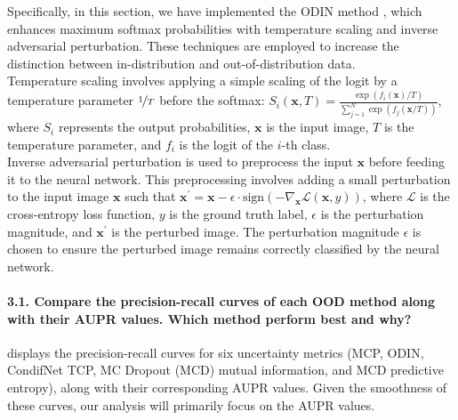 Specifically, in this section, we have implemented the ODIN method \citep{ODIN}, which enhances maximum softmax probabilities with temperature scaling and inverse adversarial perturbation. These techniques are employed to increase the distinction between in-distribution and out-of-distribution data.\\
Temperature scaling involves applying a simple scaling of the logit by a temperature parameter $ \nicefrac{1}{T} $ before the softmax: $ S_i(\boldsymbol{x}, T) = \frac{\exp (f_i(\boldsymbol{x}) / T)}{\sum_{j=1}^{N} \exp (f_j(\boldsymbol{x} / T))} $, where $ S_i $ represents the output probabilities, $ \boldsymbol{x} $ is the input image, $ T $ is the temperature parameter, and $ f_i $ is the logit of the $ i $-th class.\\
Inverse adversarial perturbation is used to preprocess the input $ \boldsymbol{x} $ before feeding it to the neural network. This preprocessing involves adding a small perturbation to the input image $ \boldsymbol{x} $ such that $ \boldsymbol{x}^\prime = \boldsymbol{x} - \epsilon \cdot \text{sign}(-\nabla_{\boldsymbol{x}} \mathcal{L}(\boldsymbol{x}, y)) $, where $ \mathcal{L} $ is the cross-entropy loss function, $ y $ is the ground truth label, $ \epsilon $ is the perturbation magnitude, and $ \boldsymbol{x}^\prime $ is the perturbed image. The perturbation magnitude $ \epsilon $ is chosen to ensure the perturbed image remains correctly classified by the neural network.

\paragraph*{3.1. Compare the precision-recall curves of each OOD method along with their AUPR values. Which method perform best and why?}
 displays the precision-recall curves for six uncertainty metrics (MCP, ODIN, CondifNet TCP, MC Dropout (MCD) mutual information, and MCD predictive entropy), along with their corresponding AUPR values. Given the smoothness of these curves, our analysis will primarily focus on the AUPR values.

